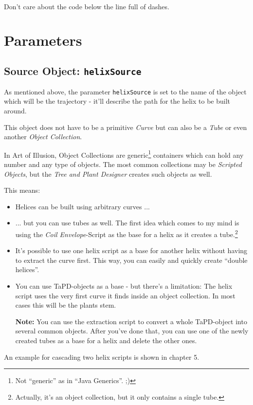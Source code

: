 \documentclass[12pt,a4paper]{scrartcl}
\begin{document}
Don't care about the code below the line full of dashes.

\section{Parameters}
\subsection{Source Object: \texttt{helixSource}}
As mentioned above, the parameter \texttt{helixSource} is set to the
name of the object which will be the trajectory - it'll describe the
path for the helix to be built around.

This object does not have to be a primitive \emph{Curve} but can also
be a \emph{Tube} or even another \emph{Object Collection}.

In Art of Illusion, Object Collections are generic\footnote{Not ``generic''
as in ``Java Generics''. ;)} containers which can hold any number and
any type of objects. The most common collections may be \emph{Scripted
Objects}, but the \emph{Tree and Plant Designer} creates such objects
as well.

This means:
\begin{itemize}
	\item Helices can be built using arbitrary curves ...
	\item ... but you can use tubes as well. The first idea which
		comes to my mind is using the \emph{Coil Envelope}-Script as the
		base for a helix as it creates a tube.\footnote{Actually, it's
		an object collection, but it only contains a single tube.}
	\item It's possible to use one helix script as a base for another
		helix without having to extract the curve first. This way,
		you can easily and quickly create ``double helices''.
	\item You can use TaPD-objects as a base - but there's a limitation:
		The helix script uses the very first curve it finds inside an
		object collection. In most cases this will be the plants stem.
		
		\textbf{Note:} You can use the extraction script to convert a
		whole TaPD-object into several common objects. After you've done that,
		you can use one of the newly created tubes as a base for a helix
		and delete the other ones.
\end{itemize}

An example for cascading two helix scripts is shown in chapter 5.
\end{document}
